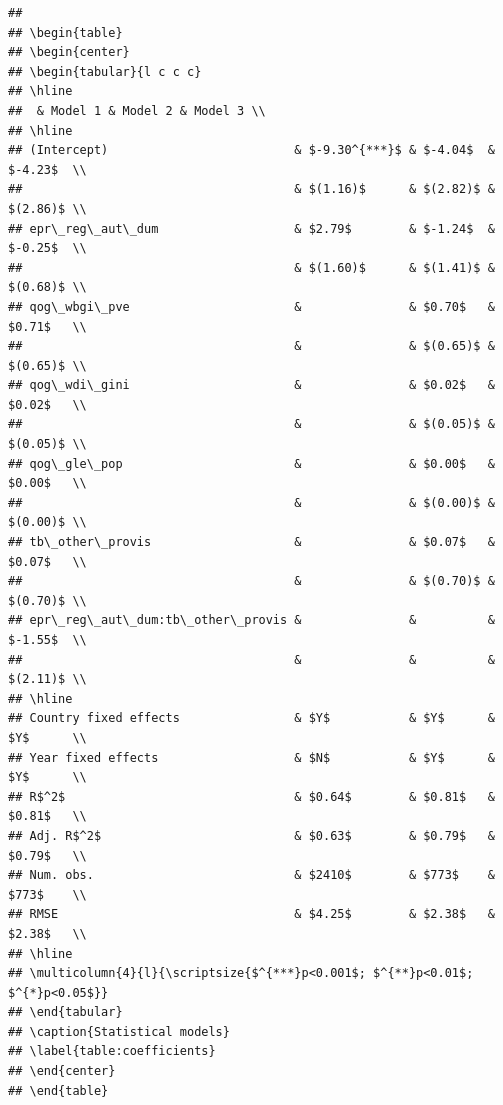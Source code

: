 \documentclass[
]{article}
\begin{document}
\begin{verbatim}
## 
## \begin{table}
## \begin{center}
## \begin{tabular}{l c c c}
## \hline
##  & Model 1 & Model 2 & Model 3 \\
## \hline
## (Intercept)                          & $-9.30^{***}$ & $-4.04$  & $-4.23$  \\
##                                      & $(1.16)$      & $(2.82)$ & $(2.86)$ \\
## epr\_reg\_aut\_dum                   & $2.79$        & $-1.24$  & $-0.25$  \\
##                                      & $(1.60)$      & $(1.41)$ & $(0.68)$ \\
## qog\_wbgi\_pve                       &               & $0.70$   & $0.71$   \\
##                                      &               & $(0.65)$ & $(0.65)$ \\
## qog\_wdi\_gini                       &               & $0.02$   & $0.02$   \\
##                                      &               & $(0.05)$ & $(0.05)$ \\
## qog\_gle\_pop                        &               & $0.00$   & $0.00$   \\
##                                      &               & $(0.00)$ & $(0.00)$ \\
## tb\_other\_provis                    &               & $0.07$   & $0.07$   \\
##                                      &               & $(0.70)$ & $(0.70)$ \\
## epr\_reg\_aut\_dum:tb\_other\_provis &               &          & $-1.55$  \\
##                                      &               &          & $(2.11)$ \\
## \hline
## Country fixed effects                & $Y$           & $Y$      & $Y$      \\
## Year fixed effects                   & $N$           & $Y$      & $Y$      \\
## R$^2$                                & $0.64$        & $0.81$   & $0.81$   \\
## Adj. R$^2$                           & $0.63$        & $0.79$   & $0.79$   \\
## Num. obs.                            & $2410$        & $773$    & $773$    \\
## RMSE                                 & $4.25$        & $2.38$   & $2.38$   \\
## \hline
## \multicolumn{4}{l}{\scriptsize{$^{***}p<0.001$; $^{**}p<0.01$; $^{*}p<0.05$}}
## \end{tabular}
## \caption{Statistical models}
## \label{table:coefficients}
## \end{center}
## \end{table}
\end{verbatim}
\end{document}
